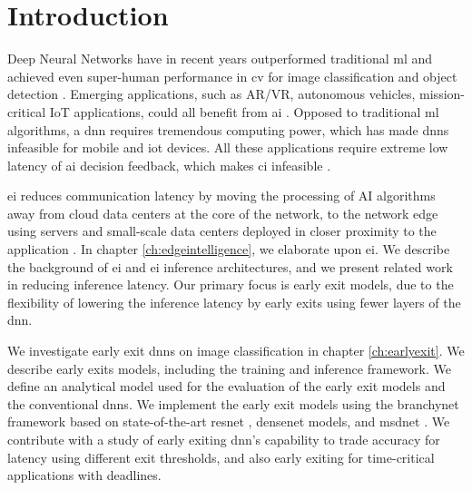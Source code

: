 
\hypertarget{introduction}{%
	\chapter{Introduction}\label{ch:introduction}}

Deep Neural Networks have in recent years outperformed traditional \gls{ml} and achieved even super-human performance in \gls{cv} for image classification and object detection \cite{russakovsky_imagenet_2015}. Emerging applications, such as AR/VR, autonomous vehicles, mission-critical IoT applications, could all benefit from \gls{ai} \cite{pettey_immersive_2018}. Opposed to traditional \gls{ml} algorithms, a \gls{dnn} requires tremendous computing power, which has made \gls{dnn}s infeasible for mobile and \gls{iot} devices. All these applications require extreme low latency of \gls{ai} decision feedback, which makes \gls{ci} infeasible \cite{zhou_edge_2019}. 

\acrlong{ei} reduces communication latency by moving the processing of AI algorithms away from cloud data centers at the core of the network, to the network edge using servers and small-scale data centers deployed in closer proximity to the application \cite{shi_edge_2016}. In chapter \ref{ch:edgeintelligence}, we elaborate upon \gls{ei}. We describe the background of \gls{ei} and \gls{ei} inference architectures, and we present related work in reducing inference latency. Our primary focus is early exit models, due to the flexibility of lowering the inference latency by early exits using fewer layers of the \gls{dnn}.

We investigate early exit \gls{dnn}s on image classification in chapter \ref{ch:earlyexit}. We describe early exits models, including the training and inference framework. We define an analytical model used for the evaluation of the early exit models and the conventional \gls{dnn}s. We implement the early exit models using the \gls{branchynet} framework \cite{teerapittayanon_branchynet:_2016} based on state-of-the-art \gls{resnet} \cite{he_deep_2015}, \gls{densenet} \cite{huang_densely_2016} models, and \gls{msdnet} \cite{huang_multi-scale_2017}. We contribute with a study of early exiting \gls{dnn}'s capability to trade accuracy for latency using different exit thresholds, and also early exiting for time-critical applications with deadlines.

